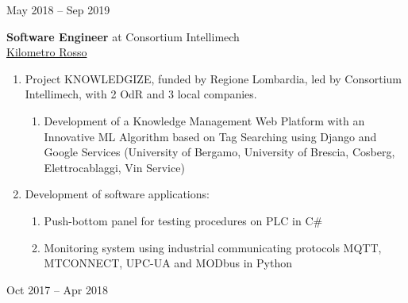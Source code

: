 \documentclass[10pt]{article}
\begin{document}
\hfill\vrule\hfill
\begin{minipage}[t]{.16\textwidth}
	\raggedleft
	May 2018 – Sep 2019
\end{minipage}

\vspace{20pt} %

\noindent
\begin{minipage}[t]{.8\textwidth}
	\raggedright
	\textbf{Software Engineer} at Consortium Intellimech\\
	\href{https://www.linkedin.com/company/kilometro-rosso/}{Kilometro Rosso}
	\vspace{6pt}
	\begin{enumerate}
		\item Project KNOWLEDGIZE, funded by Regione Lombardia, led by Consortium Intellimech, with 2 OdR and 3 local companies.
		  \begin{enumerate}
			\item Development of a Knowledge Management Web Platform with an Innovative ML Algorithm based on Tag Searching using Django and Google Services (University of Bergamo, University of Brescia, Cosberg, Elettrocablaggi, Vin Service)
		\end{enumerate}
		\item Development of software applications:
		  \begin{enumerate}
			\item Push-bottom panel for testing procedures on PLC in C\#
			\item Monitoring system using industrial communicating protocols MQTT, MTCONNECT, UPC-UA and MODbus in Python
		\end{enumerate}
  \end{enumerate}
\end{minipage}%
\hfill\vrule\hfill
\begin{minipage}[t]{.16\textwidth}
	\raggedleft
	Oct 2017 – Apr 2018
\end{minipage}

\clearpage

\end{document}
